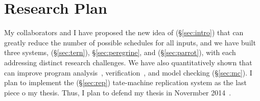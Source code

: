 \section{Research Plan} \label{sec:plan}

My collaborators and I have proposed the new idea of \smt (\S\ref{sec:intro}) that can greatly reduce the number of 
possible schedules for all inputs, and we have built three systems, \tern 
(\S\ref{sec:tern}), \peregrine \S\ref{sec:peregrine}, and \parrot 
(\S\ref{sec:parrot}), with each addressing distinct research challenges. We 
have also quantitatively shown that \smt can improve program 
analysis~\cite{wu:pldi12}, verification~\cite{peregrine:sosp11, wu:pldi12}, 
and model checking (\S\ref{sec:mc}). I plan to implement the 
\msmr (\S\ref{sec:rep}) tate-machine replication system as the last piece o my thesis.
Thus, I plan to defend my thesis in Novermber 2014~\cite{dthreads:sosp11}.
  





\pagebreak

